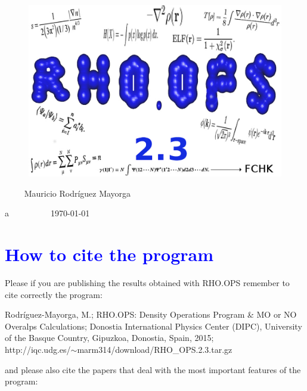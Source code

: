\documentclass[10pt,a4paper]{article}
\newcommand{\tbl}[1]{{\textcolor{blue}{#1}}}
\begin{document}
\begin{figure}[H]
\begin{center}
\includegraphics[angle=0, scale=0.5]{rhoops.eps}
\end{center}
\label{rhoops}
\end{figure}
\begin{center}
\begin{LARGE}
$\qquad$ Mauricio Rodr\'iguez Mayorga \newline
\end{LARGE}
{\color{white}a}\newline
$\qquad$ $\qquad$ \today
\end{center}

\section{\tbl{\textbf{How to cite the program}}}
Please if you are publishing the results obtained with RHO.OPS remember to cite correctly the program: \newline

   Rodr\'iguez-Mayorga, M.; RHO.OPS: Density Operations Program \& MO or NO Overalps Calculations; Donostia International Physics Center (DIPC), University of the Basque Country, Gipuzkoa, Donostia, Spain, 2015;\\ http://iqc.udg.es/$\sim$marm314/download/RHO\_OPS.2.3.tar.gz\newline

and please also cite the papers that deal with the most important features of the program:\newline
\end{document}
